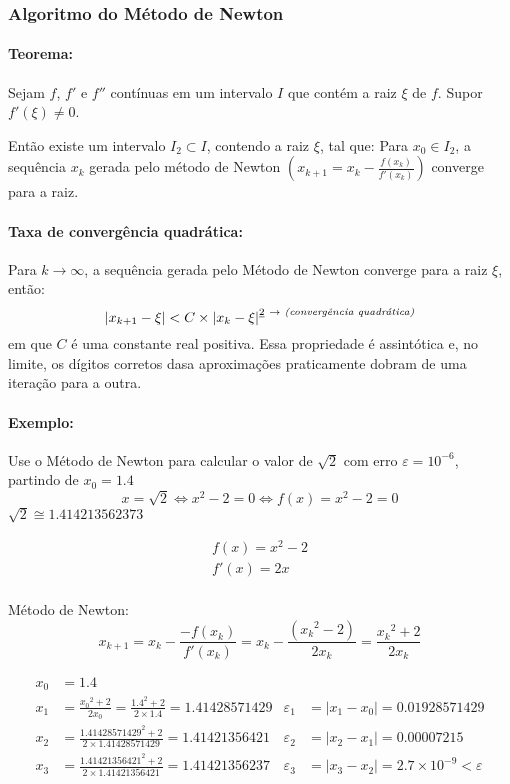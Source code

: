 \documentclass{article}
\begin{document}
            \subsubsection*{Algoritmo do Método de Newton} %

            \paragraph{Teorema:} Sejam $f$, $f'$ e $f''$ contínuas em um intervalo $I$ que contém a raiz $\xi$ de $f$. Supor $f'(\xi) \neq 0$.

            Então existe um intervalo $I_2 \subset I$, contendo a raiz $\xi$, tal que: Para $x_0 \in I_2$, a sequência $x_k$ gerada pelo método de Newton $(x_{k+1} = x_k - \frac{f(x_k)}{f'(x_k)})$ converge para a raiz.

            \paragraph{Taxa de convergência quadrática:} Para $k \to \infty$, a sequência gerada pelo Método de Newton converge para a raiz $\xi$, então:
            \[|x_{k+1} - \xi| < C \times {|x_k - \xi|}^{\underline{2}~\to \text{\textit{ (convergência quadrática)}}}\]
            em que $C$ é uma constante real positiva. Essa propriedade é assintótica e, no limite, os dígitos corretos dasa aproximações praticamente dobram de uma iteração para a outra.

            \paragraph{Exemplo:} Use o Método de Newton para calcular o valor de $\sqrt{2}$ com erro $\varepsilon = 10^{-6}$, partindo de $x_0 = 1.4$
            \[x = \sqrt{2} \iff x^2 - 2 = 0 \iff f(x) = x^2 - 2 = 0\]
            \hfill $\sqrt{2} \cong 1.414213562373$

            \begin{gather*}
                f(x) = x^2 - 2\\
                f'(x) = 2x\\
            \end{gather*}
            
            Método de Newton: 
            \[x_{k+1} = x_k - \frac{-f(x_k)}{f'(x_k)} = x_k - \frac{({x_k}^2 - 2)}{2x_k} = \frac{{x_k}^2 + 2}{2x_k}\]

            \begin{align*}
                x_0 &= 1.4\\
                x_1 &= \frac{{x_0}^2 + 2}{2x_0} = \frac{{1.4}^2 + 2}{2 \times 1.4} = 1.41428571429      &       \varepsilon_1 &= |x_1 - x_0| = 0.01928571429\\
                x_2 &= \frac{{1.41428571429}^2 + 2}{2 \times 1.41428571429} = 1.41421356421             &       \varepsilon_2 &= |x_2 - x_1| = 0.00007215\\
                x_3 &= \frac{{1.41421356421}^2 + 2}{2 \times 1.41421356421} = 1.41421356237             &       \varepsilon_3 &= |x_3 - x_2| = 2.7 \times 10^{-9} < \varepsilon\\
            \end{align*}
\end{document}
